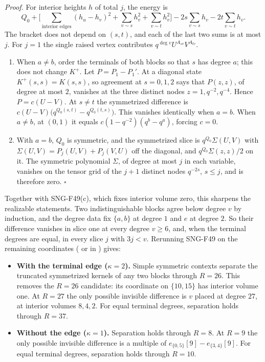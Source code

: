 \documentclass[
  11pt,
  a4paper,
]{report}
\providecommand{\tightlist}{%
  \setlength{\itemsep}{0pt}\setlength{\parskip}{0pt}}
\let\singularitytexttt\texttt
\renewcommand{\texttt}[1]{\singularitytexttt{\seqsplit{#1}}}
\begin{document}
\emph{Proof.} For interior heights \(h\) of total \(j\), the energy is
\[
Q_0+\bigl[\sum_{\text{interior edges}}(h_u-h_v)^2+\sum_{v\sim s}h_v^2+\sum_{v\sim t}h_v^2\bigr]-2s\sum_{v\sim s}h_v-2t\sum_{v\sim t}h_v.
\] The bracket does not depend on \((s,t)\), and each of the last two
sums is at most \(j\). For \(j=1\) the single raised vertex contributes
\(q^{\deg v}U^{A_{sv}}V^{A_{tv}}\).

\begin{enumerate}
\def\labelenumi{(\alph{enumi})}
\item
  When \(a\ne b\), order the terminals of both blocks so that \(s\) has
  degree \(a\); this does not change \(K^+\). Let \(P=P_1-P_1'\). At a
  diagonal state \(K^+(s,s)=K(s,s)\), so agreement at \(s=0,1,2\) says
  that \(P(z,z)\), of degree at most \(2\), vanishes at the three
  distinct nodes \(z=1,q^{-2},q^{-4}\). Hence \(P=c(U-V)\). At
  \(s\ne t\) the symmetrized difference is
  \(c(U-V)\bigl(q^{Q_0(s,t)}-q^{Q_0(t,s)}\bigr)\). This vanishes
  identically when \(a=b\). When \(a\ne b\), at \((0,1)\) it equals
  \(c(1-q^{-2})(q^b-q^a)\), forcing \(c=0\).
\item
  With \(a=b\), \(Q_0\) is symmetric, and the symmetrized slice is
  \(q^{Q_0}\Sigma(U,V)\) with \(\Sigma(U,V)=P_j(U,V)+P_j(V,U)\) off the
  diagonal, and \(q^{Q_0}\Sigma(z,z)/2\) on it. The symmetric polynomial
  \(\Sigma\), of degree at most \(j\) in each variable, vanishes on the
  tensor grid of the \(j+1\) distinct nodes \(q^{-2s}\), \(s\le j\), and
  is therefore zero. \(\square\)
\end{enumerate}

Together with SNG-F49(c), which fixes interior volume zero, this
sharpens the realizable statements. Two indistinguishable blocks agree
below degree \(v\) by induction, and the degree data fix \(\{a,b\}\) at
degree \(1\) and \(e\) at degree \(2\). So their difference vanishes in
slice one at every degree \(v\ge6\), and, when the terminal degrees are
equal, in every slice \(j\) with \(3j<v\). Rerunning SNG-F49 on the
remaining coordinates (\texttt{realizable="slice"} or
\texttt{"balanced"} in \texttt{interface\_status}) gives:

\begin{itemize}
\tightlist
\item
  \textbf{With the terminal edge (\(\kappa=2\)).} Simple symmetric
  contexts separate the truncated symmetrized kernels of any two blocks
  through \(R=26\). This removes the \(R=26\) candidate: its coordinate
  on \(\{10,15\}\) has interior volume one. At \(R=27\) the only
  possible invisible difference is \(v\) placed at degree \(27\), at
  interior volumes \(8,4,2\). For equal terminal degrees, separation
  holds through \(R=37\).
\item
  \textbf{Without the edge (\(\kappa=1\)).} Separation holds through
  \(R=8\). At \(R=9\) the only possible invisible difference is a
  multiple of \(e_{\{0,5\}}[9]-e_{\{3,4\}}[9]\). For equal terminal
  degrees, separation holds through \(R=10\).
\end{itemize}
\end{document}
